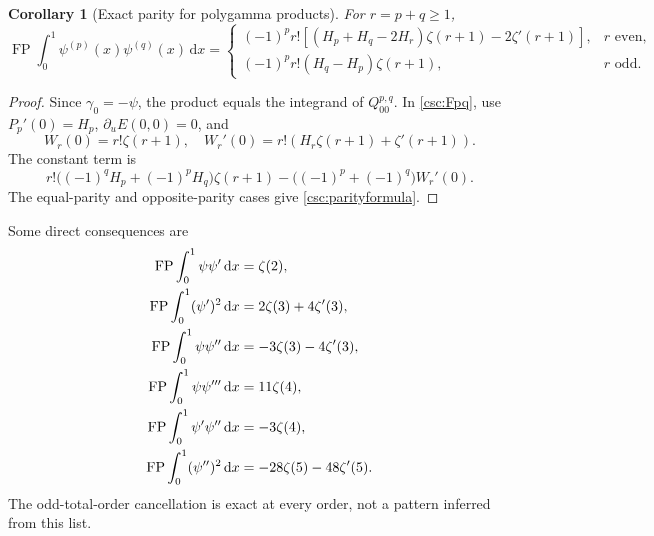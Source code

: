 \documentclass[11pt,a4paper]{article}
\numberwithin{equation}{section}
\newtheorem{corollary}[theorem]{Corollary}
\theoremstyle{definition}
\newcommand{\dd}{\,\mathrm dx}
\newcommand{\FP}{\operatorname{FP}}
\begin{document}
\begin{corollary}[Exact parity for polygamma products]\label{csc:parity}
For $r=p+q\ge1$,
\begin{equation}\label{csc:parityformula}
\FP\int_0^1\psi^{(p)}(x)\psi^{(q)}(x)\dd
=\begin{cases}
\displaystyle(-1)^pr!\left[(H_p+H_q-2H_r)\zeta(r+1)-2\zeta'(r+1)\right],
&r\text{ even},\\[4pt]
\displaystyle(-1)^pr!(H_q-H_p)\zeta(r+1),
&r\text{ odd}.
\end{cases}
\end{equation}
\end{corollary}
\begin{proof}
Since $\gamma_0=-\psi$, the product equals the integrand of $Q_{00}^{p,q}$. In \eqref{csc:Fpq}, use $P_p'(0)=H_p$, $\partial_uE(0,0)=0$, and
\[
W_r(0)=r!\zeta(r+1),\quad
W_r'(0)=r!\left(H_r\zeta(r+1)+\zeta'(r+1)\right).
\]
The constant term is
\[
r!\big((-1)^qH_p+(-1)^pH_q\big)\zeta(r+1)
-\big((-1)^p+(-1)^q\big)W_r'(0).
\]
The equal-parity and opposite-parity cases give \eqref{csc:parityformula}.
\end{proof}
Some direct consequences are
\begin{align}
\FP\int_0^1\psi\psi'\dd&=\zeta(2),\label{csc:polygammaexamples}\\
\FP\int_0^1(\psi')^2\dd&=2\zeta(3)+4\zeta'(3),\notag\\
\FP\int_0^1\psi\psi''\dd&=-3\zeta(3)-4\zeta'(3),\notag\\
\FP\int_0^1\psi\psi'''\dd&=11\zeta(4),\notag\\
\FP\int_0^1\psi'\psi''\dd&=-3\zeta(4),\notag\\
\FP\int_0^1(\psi'')^2\dd&=-28\zeta(5)-48\zeta'(5).\notag
\end{align}
The odd-total-order cancellation is exact at every order, not a pattern inferred from this list.
\end{document}
